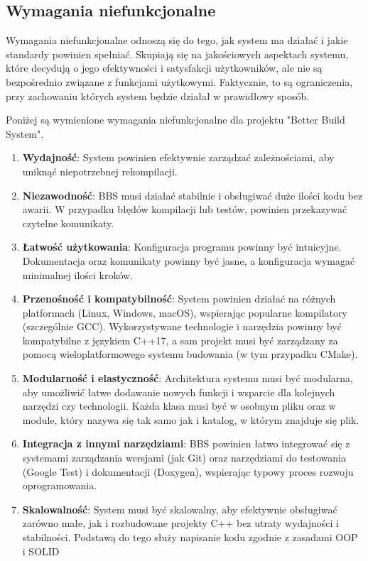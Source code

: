 \subsection{Wymagania niefunkcjonalne}
Wymagania niefunkcjonalne odnoszą się do tego, jak system ma działać i jakie standardy powinien spełniać. Skupiają się na jakościowych aspektach systemu, które decydują o jego efektywności i satysfakcji użytkowników, ale nie są bezpośrednio związane z funkcjami użytkowymi. Faktycznie, to są ograniczenia, przy zachowaniu których system będzie działał w prawidłowy sposób.

Poniżej są wymienione wymagania niefunkcjonalne dla projektu "Better Build System".
\begin{enumerate}
    \item \textbf{Wydajność}: System powinien efektywnie zarządzać zależnościami, aby uniknąć niepotrzebnej rekompilacji.
    \item \textbf{Niezawodność}: BBS musi działać stabilnie i obsługiwać duże ilości kodu bez awarii. W przypadku błędów kompilacji lub testów, powinien przekazywać czytelne komunikaty.
    \item \textbf{Łatwość użytkowania}: Konfiguracja programu powinny być intuicyjne. Dokumentacja oraz komunikaty powinny być jasne, a konfiguracja wymagać minimalnej ilości kroków.
    \item \textbf{Przenośność i kompatybilność}: System powinien działać na różnych platformach (Linux, Windows, macOS), wspierając popularne kompilatory (szczególnie GCC). Wykorzystywane technologie i narzędzia powinny być kompatybilne z językiem C++17, a sam projekt musi być zarządzany za pomocą wieloplatformowego systemu budowania (w tym przypadku CMake).
    \item \textbf{Modularność i elastyczność}: Architektura systemu musi być modularna, aby umożliwić łatwe dodawanie nowych funkcji i wsparcie dla kolejnych narzędzi czy technologii. Każda klasa musi być w osobnym pliku oraz w module, który nazywa się tak samo jak i katalog, w którym znajduje się plik.
    \item \textbf{Integracja z innymi narzędziami}: BBS powinien łatwo integrować się z systemami zarządzania wersjami (jak Git) oraz narzędziami do testowania (Google Test) i dokumentacji (Doxygen), wspierając typowy proces rozwoju oprogramowania.
    \item \textbf{Skalowalność}: System musi być skalowalny, aby efektywnie obsługiwać zarówno małe, jak i rozbudowane projekty C++ bez utraty wydajności i stabilności. Podstawą do tego służy napisanie kodu zgodnie z zasadami OOP i SOLID

\end{enumerate}
